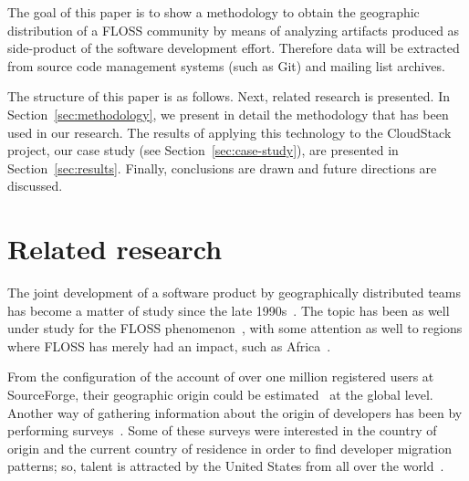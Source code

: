\documentclass{sig-alternate-05-2015}
\begin{document}
The goal of this paper is to show a methodology to obtain the geographic
distribution of a FLOSS community by means of analyzing artifacts produced
as side-product of the software development effort. Therefore data will be
extracted from source code management systems (such as Git) and mailing list
archives.

The structure of this paper is as follows.
Next, related research is presented. In Section~\ref{sec:methodology}, we present
in detail the methodology that has been used in our research. The results
of applying this technology to the CloudStack project, our case study 
(see Section~\ref{sec:case-study}), are presented in Section~\ref{sec:results}.
Finally, conclusions are drawn and future directions are discussed.


%
%
% 


\section{Related research}
\label{sec:related}

The joint development of a software product by geographically distributed
teams has become a matter of study since the late 1990s~\cite{carmel1999global}.
The topic has been as well under study for the FLOSS phenomenon~\cite{german2003gnome,engelhardt2009geographic,von2010geographic},
with some attention as well
to regions where FLOSS has merely had an impact, such as 
Africa~\cite{ouattara2013open}.

From the configuration of the account of over one million registered users
at SourceForge, their geographic origin could be estimated~\cite{robles2006geographic,gonzalez2008geographic} at the global level. Another way
of gathering information about the origin of developers has been by performing
surveys~\cite{ghosh2002free,david2008community}. Some of these surveys were
interested in the country of origin and the current country of residence in
order to find developer migration patterns; so, talent is attracted by
the United States from all over the world~\cite{ghosh2002free}.
\end{document}
